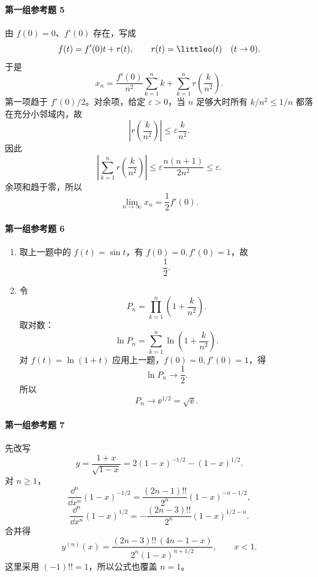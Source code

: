 \paragraph{第一组参考题 5}
\begin{xsolution}
由 $f(0)=0$、$f'(0)$ 存在，写成
\[
  f(t)=f'(0)t+r(t),\qquad r(t)=\littleo(t)\quad(t\to0).
\]
于是
\[
  x_n=\frac{f'(0)}{n^2}\sum_{k=1}^n k+\sum_{k=1}^n r\left(\frac{k}{n^2}\right).
\]
第一项趋于 $f'(0)/2$。对余项，给定 $\varepsilon>0$，当 $n$ 足够大时所有 $k/n^2\le1/n$ 都落在充分小邻域内，故
\[
  \left|r\left(\frac{k}{n^2}\right)\right|
  \le\varepsilon\frac{k}{n^2}.
\]
因此
\[
  \left|\sum_{k=1}^n r\left(\frac{k}{n^2}\right)\right|
  \le\varepsilon\frac{n(n+1)}{2n^2}\le\varepsilon.
\]
余项和趋于零，所以
\[
  \boxed{\lim_{n\to\infty}x_n=\frac12f'(0)}.
\]
\end{xsolution}

\paragraph{第一组参考题 6}
\begin{xsolution}
\begin{enumerate}[label=(\arabic*)]
  \item 取上一题中的 $f(t)=\sin t$，有 $f(0)=0,f'(0)=1$，故
  \[
    \boxed{\frac12}.
  \]
  \item 令
  \[
    P_n=\prod_{k=1}^n\left(1+\frac{k}{n^2}\right).
  \]
  取对数：
  \[
    \ln P_n=\sum_{k=1}^n\ln\left(1+\frac{k}{n^2}\right).
  \]
  对 $f(t)=\ln(1+t)$ 应用上一题，$f(0)=0,f'(0)=1$，得
  \[
    \ln P_n\to\frac12.
  \]
  所以
  \[
    \boxed{P_n\to\ee^{1/2}=\sqrt{\ee}}.
  \]
\end{enumerate}
\end{xsolution}

\paragraph{第一组参考题 7}
\begin{xsolution}
先改写
\[
  y=\frac{1+x}{\sqrt{1-x}}=2(1-x)^{-1/2}-(1-x)^{1/2}.
\]
对 $n\ge1$，
\[
  \frac{\dd^n}{\dd x^n}(1-x)^{-1/2}
  =\frac{(2n-1)!!}{2^n}(1-x)^{-n-1/2},
\]
\[
  \frac{\dd^n}{\dd x^n}(1-x)^{1/2}
  =-\frac{(2n-3)!!}{2^n}(1-x)^{1/2-n}.
\]
合并得
\[
  \boxed{
  y^{(n)}(x)=\frac{(2n-3)!!\,(4n-1-x)}{2^n(1-x)^{n+1/2}}},
  \qquad x<1.
\]
这里采用 $(-1)!!=1$，所以公式也覆盖 $n=1$。
\end{xsolution}


